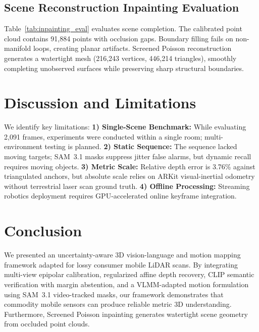 \documentclass[conference]{IEEEtran}
\begin{document}
\subsection{Scene Reconstruction Inpainting Evaluation}
Table~\ref{tab:inpainting_eval} evaluates scene completion. The calibrated point cloud contains 91,884 points with occlusion gaps. Boundary filling fails on non-manifold loops, creating planar artifacts. Screened Poisson reconstruction generates a watertight mesh (216,243 vertices, 446,214 triangles), smoothly completing unobserved surfaces while preserving sharp structural boundaries.

\section{Discussion and Limitations}
We identify key limitations: \textbf{1) Single-Scene Benchmark:} While evaluating 2,091 frames, experiments were conducted within a single room; multi-environment testing is planned. \textbf{2) Static Sequence:} The sequence lacked moving targets; SAM~3.1 masks suppress jitter false alarms, but dynamic recall requires moving objects. \textbf{3) Metric Scale:} Relative depth error is 3.76\% against triangulated anchors, but absolute scale relies on ARKit visual-inertial odometry without terrestrial laser scan ground truth. \textbf{4) Offline Processing:} Streaming robotics deployment requires GPU-accelerated online keyframe integration.

\section{Conclusion}
We presented an uncertainty-aware 3D vision-language and motion mapping framework adapted for lossy consumer mobile LiDAR scans. By integrating multi-view epipolar calibration, regularized affine depth recovery, CLIP semantic verification with margin abstention, and a VLMM-adapted motion formulation using SAM~3.1 video-tracked masks, our framework demonstrates that commodity mobile sensors can produce reliable metric 3D understanding. Furthermore, Screened Poisson inpainting generates watertight scene geometry from occluded point clouds.
\end{document}
